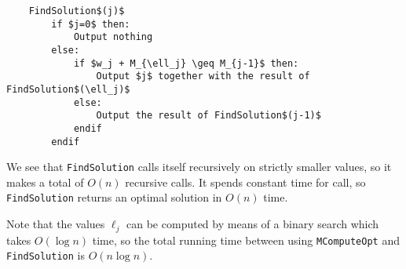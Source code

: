 \begin{lstlisting}
    FindSolution$(j)$
        if $j=0$ then:
            Output nothing
        else: 
            if $w_j + M_{\ell_j} \geq M_{j-1}$ then: 
                Output $j$ together with the result of FindSolution$(\ell_j)$
            else: 
                Output the result of FindSolution$(j-1)$
            endif 
        endif
\end{lstlisting}

We see that \texttt{FindSolution} calls itself recursively on strictly 
smaller values, so it makes a total of $O(n)$ recursive calls. It spends 
constant time for call, so \texttt{FindSolution} returns an optimal solution 
in $O(n)$ time. 

Note that the values $\ell_j$ can be computed by means of a binary search 
which takes $O(\log n)$ time, so the total running time between 
using \texttt{MComputeOpt} and \texttt{FindSolution} is $O(n\log n)$. 
